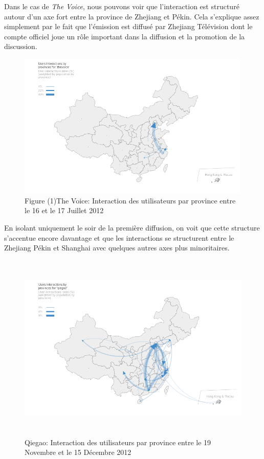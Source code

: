 Dans le cas de \textit{The Voice}, nous pouvons voir que
l{\textquoteright}interaction est structur\'e autour
d{\textquoteright}un axe fort entre la province de Zhejiang et P\'ekin.
Cela s{\textquoteright}explique assez simplement par le fait que
l{\textquoteright}\'emission est diffus\'e par Zhejiang T\'el\'evision
dont le compte officiel joue un r\^ole important dans la diffusion et
la promotion de la discussion.
\begin{figure}
    \centering
    \includegraphics[width=4.3858in,height=2.7413in]{figures/chap4/chapitre4-img20.png}
    
  \caption{
    Figure (1)The Voice: Interaction des utilisateurs par province entre le 16 et le 17 Juillet 2012
  }
\end{figure}

En isolant uniquement le soir de la premi\`ere diffusion, on voit que
cette structure s{\textquoteright}accentue encore davantage et que les
interactions se structurent entre le Zhejiang P\'ekin et Shanghai avec
quelques autres axes plus minoritaires.

\begin{figure}
    \centering
    \includegraphics[width=5.7059in,height=3.5661in]{figures/chap4/chapitre4-img21.png}
  \caption{
    Qiegao: Interaction des utilisateurs par province entre le 19 Novembre et le 15 D\'ecembre 2012
  }
\end{figure}


